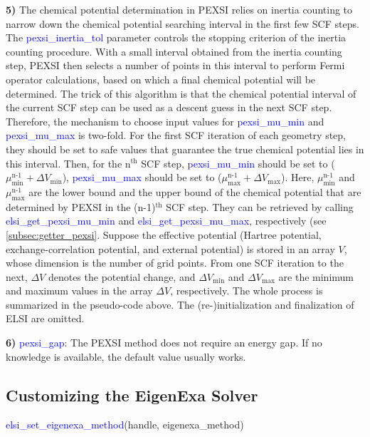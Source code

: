\documentclass{report}
\begin{document}
\textbf{5)} The chemical potential determination in PEXSI relies on inertia counting to narrow down the chemical potential searching interval in the first few SCF steps. The \textcolor{blue}{pexsi\_inertia\_tol} parameter controls the stopping criterion of the inertia counting procedure. With a small interval obtained from the inertia counting step, PEXSI then selects a number of points in this interval to perform Fermi operator calculations, based on which a final chemical potential will be determined. The trick of this algorithm is that the chemical potential interval of the current SCF step can be used as a descent guess in the next SCF step. Therefore, the mechanism to choose input values for \textcolor{blue}{pexsi\_mu\_min} and \textcolor{blue}{pexsi\_mu\_max} is two-fold. For the first SCF iteration of each geometry step, they should be set to safe values that guarantee the true chemical potential lies in this interval. Then, for the n$^\text{th}$ SCF step, \textcolor{blue}{pexsi\_mu\_min} should be set to ($\mu_\text{min}^\text{n-1} + \Delta V_\text{min}$), \textcolor{blue}{pexsi\_mu\_max} should be set to ($\mu_\text{max}^\text{n-1} + \Delta V_\text{max}$). Here, $\mu_\text{min}^\text{n-1}$ and $\mu_\text{max}^\text{n-1}$ are the lower bound and the upper bound of the chemical potential that are determined by PEXSI in the (n-1)$^\text{th}$ SCF step. They can be retrieved by calling \textcolor{blue}{elsi\_get\_pexsi\_mu\_min} and \textcolor{blue}{elsi\_get\_pexsi\_mu\_max}, respectively (see \ref{subsec:getter_pexsi}. Suppose the effective potential (Hartree potential, exchange-correlation potential, and external potential) is stored in an array $V$, whose dimension is the number of grid points. From one SCF iteration to the next, $\Delta V$ denotes the potential change, and $\Delta V_\text{min}$ and $\Delta V_\text{max}$ are the minimum and maximum values in the array $\Delta V$, respectively. The whole process is summarized in the pseudo-code above. The (re-)initialization and finalization of ELSI are omitted.

\textbf{6)} \textcolor{blue}{pexsi\_gap}: The PEXSI method does not require an energy gap. If no knowledge is available, the default value usually works.

\subsection{Customizing the EigenExa Solver}
\label{subsec:setter_eigenexa}
\begin{labeling}{\hspace{6cm}}
\item [\hspace{0.3cm} \textcolor{blue}{elsi\_set\_eigenexa\_method}(handle, eigenexa\_method)]
\end{labeling}
\end{document}
